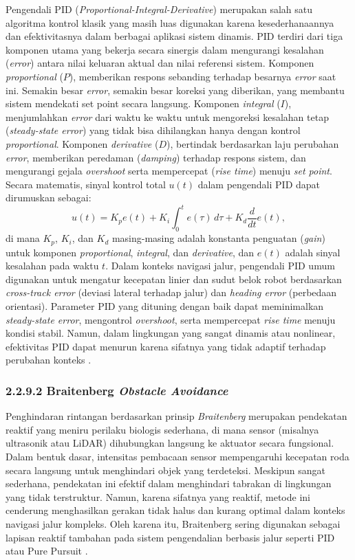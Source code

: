 Pengendali PID (\emph{Proportional-Integral-Derivative}) merupakan salah satu algoritma kontrol klasik yang masih luas digunakan karena kesederhanaannya dan efektivitasnya dalam berbagai aplikasi sistem dinamis. PID terdiri dari tiga komponen utama yang bekerja secara sinergis dalam mengurangi kesalahan (\emph{error}) antara nilai keluaran aktual dan nilai referensi sistem. Komponen  \emph{proportional} (\(P\)), memberikan respons sebanding terhadap besarnya \emph{error} saat ini. Semakin besar \emph{error}, semakin besar koreksi yang diberikan, yang membantu sistem mendekati set point secara langsung. Komponen  \emph{integral} (\(I\)), menjumlahkan \emph{error} dari waktu ke waktu untuk mengoreksi kesalahan tetap (\emph{steady-state error}) yang tidak bisa dihilangkan hanya dengan kontrol \emph{proportional}. Komponen \emph{derivative} (\(D\)), bertindak berdasarkan laju perubahan \emph{error}, memberikan peredaman (\emph{damping}) terhadap respons sistem, dan mengurangi gejala \emph{overshoot} serta mempercepat  (\emph{rise time}) menuju \emph{set point}. Secara matematis, sinyal kontrol total \( u(t) \) dalam pengendali PID dapat dirumuskan sebagai:
\begin{equation}
    u(t) = K_p e(t) + K_i \int_{0}^{t} e(\tau) \, d\tau + K_d \frac{d}{dt}e(t),
\end{equation}
di mana \( K_p \), \( K_i \), dan \( K_d \) masing-masing adalah konstanta penguatan (\emph{gain}) untuk komponen \emph{proportional}, \emph{integral}, dan \emph{derivative}, dan \( e(t) \) adalah sinyal kesalahan pada waktu \( t \). Dalam konteks navigasi jalur, pengendali PID umum digunakan untuk mengatur kecepatan linier dan sudut belok robot berdasarkan \emph{cross-track error} (deviasi lateral terhadap jalur) dan \emph{heading error} (perbedaan orientasi). Parameter PID yang dituning dengan baik dapat meminimalkan \emph{steady-state error}, mengontrol \emph{overshoot}, serta mempercepat \emph{rise time} menuju kondisi stabil. Namun, dalam lingkungan yang sangat dinamis atau nonlinear, efektivitas PID dapat menurun karena sifatnya yang tidak adaptif terhadap perubahan konteks \cite{astrom1995pid}.


\subsubsection{2.2.9.2 Braitenberg \emph{Obstacle Avoidance}}

Penghindaran rintangan berdasarkan prinsip \emph{Braitenberg} merupakan pendekatan reaktif yang meniru perilaku biologis sederhana, di mana sensor (misalnya ultrasonik atau LiDAR) dihubungkan langsung ke aktuator secara fungsional. Dalam bentuk dasar, intensitas pembacaan sensor mempengaruhi kecepatan roda secara langsung untuk menghindari objek yang terdeteksi. Meskipun sangat sederhana, pendekatan ini efektif dalam menghindari tabrakan di lingkungan yang tidak terstruktur. Namun, karena sifatnya yang reaktif, metode ini cenderung menghasilkan gerakan tidak halus dan kurang optimal dalam konteks navigasi jalur kompleks. Oleh karena itu, Braitenberg sering digunakan sebagai lapisan reaktif tambahan pada sistem pengendalian berbasis jalur seperti PID atau Pure Pursuit \cite{braitenberg1986vehicles}.

